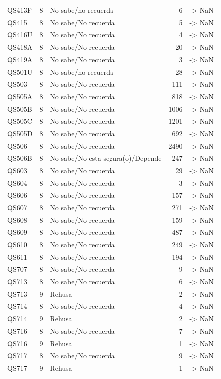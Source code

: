 \begin{longtable}{lllrl}
QS413F & 8 & No sabe/no recuerda & 6 & -> NaN \\
QS415 & 8 & No sabe/No recuerda & 5 & -> NaN \\
QS416U & 8 & No sabe/No recuerda & 4 & -> NaN \\
QS418A & 8 & No sabe/No recuerda & 20 & -> NaN \\
QS419A & 8 & No sabe/No recuerda & 3 & -> NaN \\
QS501U & 8 & No sabe/no recuerda & 28 & -> NaN \\
QS503 & 8 & No sabe/No recuerda & 111 & -> NaN \\
QS505A & 8 & No sabe/No recuerda & 818 & -> NaN \\
QS505B & 8 & No sabe/No recuerda & 1006 & -> NaN \\
QS505C & 8 & No sabe/No recuerda & 1201 & -> NaN \\
QS505D & 8 & No sabe/No recuerda & 692 & -> NaN \\
QS506 & 8 & No sabe/No recuerda & 2490 & -> NaN \\
QS506B & 8 & No sabe/No esta segura(o)/Depende & 247 & -> NaN \\
QS603 & 8 & No sabe/No recuerda & 29 & -> NaN \\
QS604 & 8 & No sabe/No recuerda & 3 & -> NaN \\
QS606 & 8 & No sabe/No recuerda & 157 & -> NaN \\
QS607 & 8 & No sabe/No recuerda & 271 & -> NaN \\
QS608 & 8 & No sabe/No recuerda & 159 & -> NaN \\
QS609 & 8 & No sabe/No recuerda & 487 & -> NaN \\
QS610 & 8 & No sabe/No recuerda & 249 & -> NaN \\
QS611 & 8 & No sabe/No recuerda & 194 & -> NaN \\
QS707 & 8 & No sabe/No recuerda & 9 & -> NaN \\
QS713 & 8 & No sabe/No recuerda & 6 & -> NaN \\
QS713 & 9 & Rehusa & 2 & -> NaN \\
QS714 & 8 & No sabe/No recuerda & 4 & -> NaN \\
QS714 & 9 & Rehusa & 2 & -> NaN \\
QS716 & 8 & No sabe/No recuerda & 7 & -> NaN \\
QS716 & 9 & Rehusa & 1 & -> NaN \\
QS717 & 8 & No sabe/No recuerda & 9 & -> NaN \\
QS717 & 9 & Rehusa & 1 & -> NaN \\

\end{longtable}
